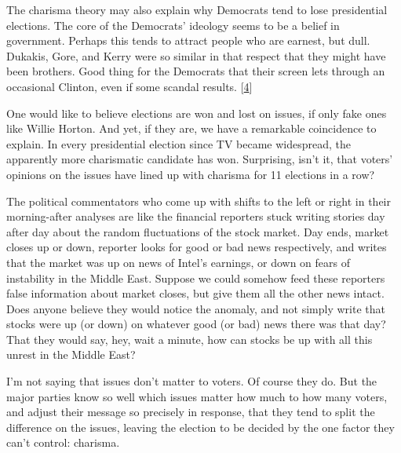 The
                  charisma theory may also explain why Democrats tend to lose
                  presidential elections. The core of the Democrats' ideology
                  seems to be a belief in government. Perhaps this tends to
                  attract people who are earnest, but dull. Dukakis, Gore, and
                  Kerry were so similar in that respect that they might have
                  been brothers. Good thing for the Democrats that their screen
                  lets through an occasional Clinton, even if some scandal
                  results.
                  [\href{\#f4n}{4}]

One would like to believe elections are won and
                  lost on issues, if only fake ones like Willie Horton. And yet,
                  if they are, we have a remarkable coincidence to explain. In
                  every presidential election since TV became widespread, the
                  apparently more charismatic candidate has won. Surprising,
                  isn't it, that voters' opinions on the issues have lined up
                  with charisma for 11 elections in a row?

The
                  political commentators who come up with shifts to the left or
                  right in their morning-after analyses are like the financial
                  reporters stuck writing stories day after day about the random
                  fluctuations of the stock market. Day ends, market closes up
                  or down, reporter looks for good or bad news respectively, and
                  writes that the market was up on news of Intel's earnings, or
                  down on fears of instability in the Middle East. Suppose we
                  could somehow feed these reporters false information about
                  market closes, but give them all the other news intact. Does
                  anyone believe they would notice the anomaly, and not simply
                  write that stocks were up (or down) on whatever good (or bad)
                  news there was that day? That they would say, hey, wait a
                  minute, how can stocks be up with all this unrest in the
                  Middle East?

I'm not saying that issues don't
                  matter to voters. Of course they do. But the major parties
                  know so well which issues matter how much to how many voters,
                  and adjust their message so precisely in response, that they
                  tend to split the difference on the issues, leaving the
                  election to be decided by the one factor they can't control:
                  charisma.

